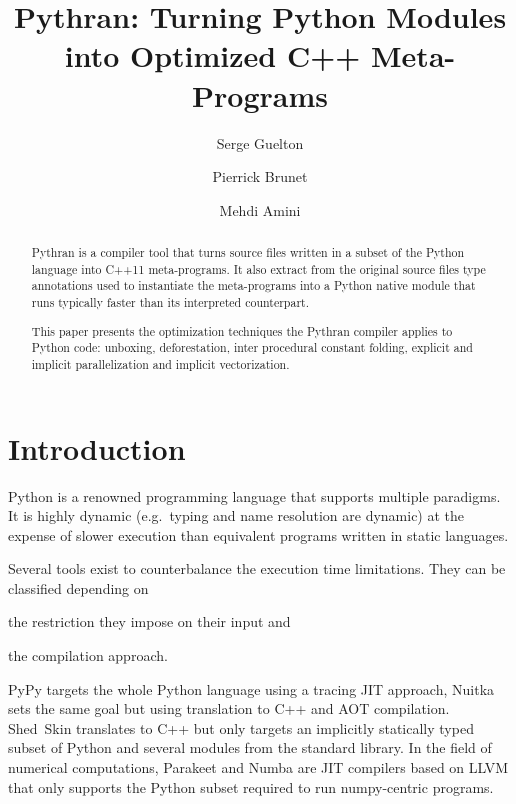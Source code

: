 \documentclass{llncs}
\title{Pythran: Turning Python Modules into Optimized C++ Meta-Programs}
\author{Serge Guelton\inst{1,2} \and Pierrick Brunet\inst{2} \and Mehdi Amini\inst{3}}
\institute{\'Ecole Normale Sup\'erieure, D\'epartement d'Informatique, Paris, France
\and
T\'el\'ecom Bretagne, Plouzan\'e, France
\and
SILKAN Inc., Los-Altos, USA
}
\begin{document}
\maketitle

\begin{abstract}

    Pythran is a compiler tool that turns source files written in a subset of
    the Python language into C++11 meta-programs. It also extract from the
    original source files type annotations used to instantiate the meta-programs
    into a Python native module that runs typically faster than its interpreted
    counterpart.

    This paper presents the optimization techniques the Pythran compiler applies
    to Python code: unboxing, deforestation, inter procedural constant folding,
    explicit and implicit parallelization and implicit vectorization.

\end{abstract}

\section{Introduction}

Python is a renowned programming language that supports multiple paradigms. It
is highly dynamic (e.g.\ typing and name resolution are dynamic) at the expense
of slower execution than equivalent programs written in static languages.

Several tools exist to counterbalance the execution time limitations. They can
be classified depending on
\begin{inparaenum}[1)]
\item the restriction they impose on their input and
\item the compilation approach.
\end{inparaenum}
PyPy\cite{pypy2009} targets the whole Python
language using a tracing \ac{JIT} approach, Nuitka\cite{nuitka2012} sets the same
goal but using translation to C++ and \ac{AOT} compilation.
Shed~Skin\cite{shedskin2006} translates to C++ but only targets an implicitly statically
typed subset of Python and several modules from the standard library. In the
field of numerical computations, Parakeet\cite{parakeet2012} and
Numba\cite{numba2013} are \ac{JIT} compilers based on LLVM that
only supports the Python subset required to run numpy-centric programs.
\end{document}
